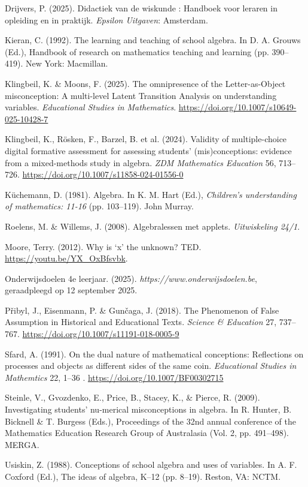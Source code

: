 \begin{bronnen}
    \item Drijvers, P. (2025). Didactiek van de wiskunde : Handboek voor leraren in opleiding en in praktijk. \textit{Epsilon Uitgaven}: Amsterdam.
    \item Kieran, C. (1992). The learning and teaching of school algebra. In D. A. Grouws (Ed.), Handbook of research on mathematics teaching and learning (pp. 390–419). New York: Macmillan.
    \item Klingbeil, K. \& Moons, F. (2025). The omnipresence of the Letter-as-Object misconception: A multi-level Latent Transition Analysis on understanding variables. \textit{Educational Studies in Mathematics}. \url{https://doi.org/10.1007/s10649-025-10428-7}
    \item Klingbeil, K., Rösken, F., Barzel, B. et al. (2024). Validity of multiple-choice digital formative assessment for assessing students’ (mis)conceptions: evidence from a mixed-methods study in algebra. \textit{ZDM Mathematics Education} 56, 713–726. \url{https://doi.org/10.1007/s11858-024-01556-0}
    \item Küchemann, D. (1981). Algebra. In K. M. Hart (Ed.), \textit{Children’s understanding of mathematics: 11-16} (pp. 103–119). John Murray.
   \item Roelens, M. \& Willems, J. (2008). Algebralessen met applets. \textit{Uitwiskeling 24/1}.
   \item Moore, Terry. (2012). Why is `x' the unknown? TED. \url{https://youtu.be/YX_OxBfsvbk}.
   \item Onderwijsdoelen 4e leerjaar. (2025). \textit{https://www.onderwijsdoelen.be}, geraadpleegd op 12 september 2025.
   \item Přibyl, J., Eisenmann, P. \& Gunčaga, J. (2018). The Phenomenon of False Assumption in Historical and Educational Texts. \textit{Science \& Education} 27, 737–767. \url{https://doi.org/10.1007/s11191-018-0005-9}
    \item Sfard, A. (1991). On the dual nature of mathematical conceptions: Reflections on processes and objects as different sides of the same coin. \textit{Educational Studies in Mathemtics} 22, 1–36 . \url{https://doi.org/10.1007/BF00302715}
    \item Steinle, V., Gvozdenko, E., Price, B., Stacey, K., \& Pierce, R. (2009). Investigating students’ nu-merical misconceptions in algebra. In R. Hunter, B. Bicknell \& T. Burgess (Eds.), Proceedings of the 32nd annual conference of the Mathematics Education Research Group of Australasia (Vol. 2, pp. 491–498). MERGA.
    \item Usiskin, Z. (1988). Conceptions of school algebra and uses of variables. In A. F. Coxford (Ed.), The ideas of algebra, K–12 (pp. 8–19). Reston, VA: NCTM.

\end{bronnen}